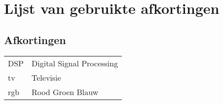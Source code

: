 \chapter{Lijst van gebruikte afkortingen}
\section*{Afkortingen}
\begin{flushleft}
  \renewcommand{\arraystretch}{1.1}
  \begin{tabularx}{\textwidth}{@{}p{12mm}X@{}}
    DSP   & Digital Signal Processing \\
    tv   & Televisie \\
	rgb	& Rood Groen Blauw \\
  \end{tabularx}
\end{flushleft}

